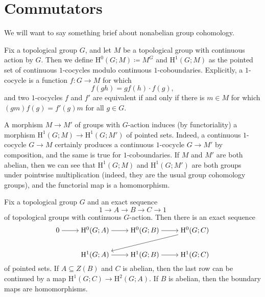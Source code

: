 \documentclass[notes.tex]{subfiles}
\begin{document}
\section{Commutators}
We will want to say something brief about nonabelian group cohomology.
\begin{definition}
	Fix a topological group $G$, and let $M$ be a topological group with continuous action by $G$. Then we define $\mathrm H^0(G;M)\coloneqq M^G$ and $\mathrm H^1(G;M)$ as the pointed set of continuous $1$-cocycles modulo continuous $1$-coboundaries. Explicitly, a $1$-cocycle is a function $f\colon G\to M$ for which
	\[f(gh)=gf(h)\cdot f(g),\]
	and two $1$-cocycles $f$ and $f'$ are equivalent if and only if there is $m\in M$ for which $(gm)f(g)=f'(g)m$ for all $g\in G$.
\end{definition}
\begin{remark}
	A morphism $M\to M'$ of groups with $G$-action induces (by functoriality) a morphism $\mathrm H^1(G;M)\to\mathrm H^1(G;M')$ of pointed sets. Indeed, a continuous $1$-cocycle $G\to M$ certainly produces a continuous $1$-cocycle $G\to M'$ by composition, and the same is true for $1$-coboundaries. If $M$ and $M'$ are both abelian, then we can see that $\mathrm H^1(G;M)$ and $\mathrm H^1(G;M')$ are both groups under pointwise multiplication (indeed, they are the usual group cohomology groups), and the functorial map is a homomorphism.
\end{remark}
\begin{lemma} \label{lem:h0-and-h1-les}
	Fix a topological group $G$ and an exact sequence
	\[1\to A\to B\to C\to1\]
	of topological groups with continuous $G$-action. Then there is an exact sequence
	\[\begin{tikzcd}[cramped]
		0 & {\mathrm H^0(G;A)} & {\mathrm H^0(G;B)} & {\mathrm H^0(G;C)} \\
		& {\mathrm H^1(G;A)} & {\mathrm H^1(G;B)} & {\mathrm H^1(G;C)}
		\arrow[from=1-1, to=1-2]
		\arrow[from=1-2, to=1-3]
		\arrow[from=1-3, to=1-4]
		\arrow[from=1-4, to=2-2]
		\arrow[from=2-2, to=2-3]
		\arrow[from=2-3, to=2-4]
	\end{tikzcd}\]
	of pointed sets. If $A\subseteq Z(B)$ and $C$ is abelian, then the last row can be continued by a map $\mathrm H^1(G;C)\to\mathrm H^2(G;A)$. If $B$ is abelian, then the boundary maps are homomorphisms.
\end{lemma}
\end{document}
